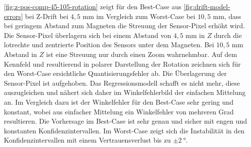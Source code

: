 \clearpage


\autoref{fig:z-pos-comp-45-105-rotation} zeigt für den Best-Case aus \autoref{fig:drift-model-errors} bei Z-Drift bei $4,5$ mm im Vergleich zum Worst-Case bei $10,5$ mm, dass bei geringem Abstand zum Magneten die Streuung der Sensor-Pixel erhöht wird. Die Sensor-Pixel überlagern sich bei einem Abstand von $4,5$ mm in $Z$ durch die lotrechte und zentrierte Position des Sensors unter dem Magneten. Bei $10,5$ mm Abstand in $Z$ ist eine Streuung nur durch einen Zoom wahrnehmbar. Auf dem Kennfeld und resultierend in polarer Darstellung der Rotation zeichnen sich für den Worst-Case ersichtliche Quantisierungsfehler ab. Die Überlagerung der Sensor-Pixel ist aufgehoben. Das Regressionsmodell schafft es nicht mehr, diese auszugleichen und nähert sich daher im Winkelfehlerbild der einfachen Mittelung an.
\newline
Im Vergleich dazu ist der Winkelfehler für den Best-Case sehr gering und konstant, wobei aus einfacher Mittelung ein Winkelfehler von mehreren Grad resultieren. Die Vorhersage im Best-Case ist sehr genau und sicher mit engen und konstanten Konfidenzintervallen. Im Worst-Case zeigt sich die Instabilität in den Konfidenzintervallen mit einem Vertrauensverlust bis zu $\pm\SI{2}{\degree}$.


